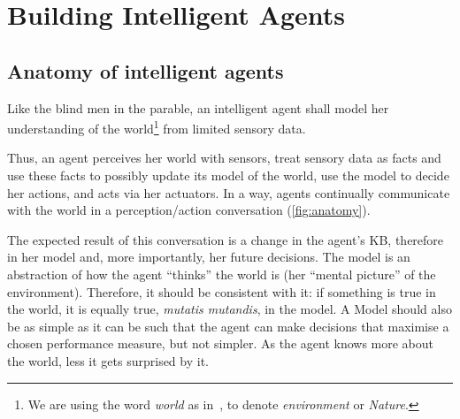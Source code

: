 \section{Building Intelligent Agents}
\subsection{Anatomy of intelligent agents}\label{sec:anatomy_ia}

Like the blind men in the parable, an intelligent agent shall model her understanding of the world\footnote{We are using the word \emph{world} as in~, to denote \emph{environment} or \emph{Nature}.} from limited sensory data.


Thus, an agent perceives her world with sensors, treat sensory data as facts and use these facts to possibly update its model of the world, use the model to decide her actions, and acts via her actuators. In a way, agents continually communicate with the world in a perception/action conversation (\cref{fig:anatomy}).

The expected result of this conversation is a change in the agent's \acf{KB}, therefore in her model and, more importantly, her future decisions. The model is an abstraction of how the agent ``thinks'' the world is (her ``mental picture'' of the environment). Therefore, it should be consistent with it: if something is true in the world, it is equally true, \emph{mutatis mutandis}, in the model. A Model should also be as simple as it can be such that the agent can make decisions that maximise a chosen performance measure, but not simpler. As the agent knows more about the world, less it gets surprised by it.

